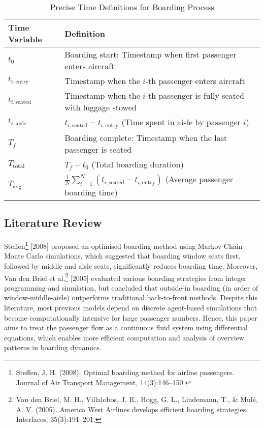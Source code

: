 \documentclass[12pt]{article}
\begin{document}
\begin{table}[H]
\centering
\caption{Precise Time Definitions for Boarding Process}
\begin{tabular}{lp{10cm}}
\hline
\textbf{Time Variable} & \textbf{Definition} \\
\hline
$t_0$ & Boarding start: Timestamp when first passenger enters aircraft \\
$t_{i,\text{entry}}$ & Timestamp when the $i$-th passenger enters aircraft \\
$t_{i,\text{seated}}$ & Timestamp when the $i$-th passenger is fully seated with luggage stowed \\
$t_{i,\text{aisle}}$ & $t_{i,\text{seated}} - t_{i,\text{entry}}$ (Time spent in aisle by passenger $i$) \\
$T_f$ & Boarding complete: Timestamp when the last passenger is seated \\
$T_{\text{total}}$ & $T_f - t_0$ (Total boarding duration) \\
$T_{\text{avg}}$ & $\frac{1}{N}\sum_{i=1}^{N} (t_{i,\text{seated}} - t_{i,\text{entry}})$ (Average passenger boarding time) \\
\hline
\end{tabular}
\end{table}

\subsection{Literature Review}

Steffen\footnote{Steffen, J. H. (2008). Optimal boarding method for airline passengers. Journal of Air Transport Management, 14(3):146–150.} [2008] proposed an optimised boarding method using Markov Chain Monte Carlo simulations, which suggested that boarding window seats first, followed by middle and aisle seats, significantly reduces boarding time. Moreover, Van den Briel et al.\footnote{Van den Briel, M. H., Villalobos, J. R., Hogg, G. L., Lindemann, T., \& Mul\'e, A. V. (2005). America West Airlines develops efficient boarding strategies. Interfaces, 35(3):191–201.} [2005] evaluated various boarding strategies from integer programming and simulation, but concluded that outside-in boarding (in order of window-middle-aisle) outperforms traditional back-to-front methods. Despite this literature, most previous models depend on discrete agent-based simulations that become computationally intensive for large passenger numbers. Hence, this paper aims to treat the passenger flow as a continuous fluid system using differential equations, which enables more efficient computation and analysis of overview patterns in boarding dynamics.
\end{document}
